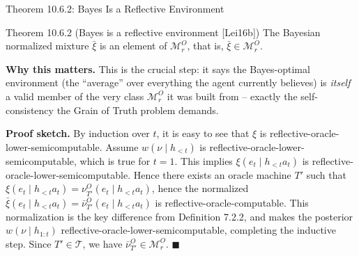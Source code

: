 \documentclass[aspectratio=169,10pt]{beamer}
\newcommand{\Mc}{\mathcal{M}}
\newcommand{\Tc}{\mathcal{T}}
\begin{document}
\begin{frame}{Theorem 10.6.2: Bayes Is a Reflective Environment}
  \begin{block}{Theorem 10.6.2 (Bayes is a reflective environment {\footnotesize[Lei16b]})}
    The Bayesian normalized mixture $\bar\xi$ is an element of $\Mc_r^O$,
    that is, $\bar\xi\in\Mc_r^O$.
  \end{block}
  \textbf{Why this matters.} This is the crucial step: it says the
  Bayes-optimal environment (the ``average'' over everything the agent
  currently believes) is \emph{itself} a valid member of the very class
  $\Mc_r^O$ it was built from -- exactly the self-consistency the Grain of
  Truth problem demands.

  \vspace{0.3em}
  \textbf{Proof sketch.} By induction over $t$, it is easy to see that
  $\xi$ is reflective-oracle-lower-semicomputable. Assume $w(\nu\mid
  h_{<t})$ is reflective-oracle-lower-semicomputable, which is true for
  $t=1$. This implies $\xi(e_t\mid h_{<t}a_t)$ is
  reflective-oracle-lower-semicomputable. Hence there exists an oracle
  machine $T'$ such that $\xi(e_t\mid h_{<t}a_t)=\nu_{T'}^O(e_t\mid
  h_{<t}a_t)$, hence the normalized $\bar\xi(e_t\mid
  h_{<t}a_t)=\bar\nu_{T'}^O(e_t\mid h_{<t}a_t)$ is
  reflective-oracle-computable. This normalization is the key difference
  from Definition 7.2.2, and makes the posterior $w(\nu\mid h_{1:t})$
  reflective-oracle-lower-semicomputable, completing the inductive step.
  Since $T'\in\Tc$, we have $\bar\nu_{T'}^O\in\Mc_r^O$. $\blacksquare$
\end{frame}
\end{document}
